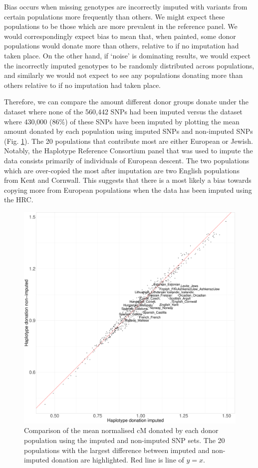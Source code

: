 {Bias occurs when missing genotypes are incorrectly imputed with variants from certain populations more frequently than others. We might expect these populations to be those which are more prevalent in the reference panel. We would correspondingly expect bias to mean that, when painted, some donor populations would donate more than others, relative to if no imputation had taken place. On the other hand, if `noise' is dominating results, we would expect the incorrectly imputed genotypes to be randomly distributed across populations, and similarly we would not expect to see any populations donating more than others relative to if no imputation had taken place. 

Therefore, we can compare the amount different donor groups donate under the dataset where none of the 560,442 SNPs had been imputed versus the dataset where 430,000 (86\%) of these SNPs have been imputed by plotting the mean amount donated by each population using imputed SNPs and non-imputed SNPs (Fig. \ref{fig:imputed_nonimputed_donation}). The 20 populations that contribute most are either European or Jewish. Notably, the Haplotype Reference Consortium panel that was used to impute the data consists primarily of individuals of European descent. The two populations which are over-copied the most after imputation are two English populations from Kent and Cornwall. This suggests that there is a most likely a bias towards copying more from European populations when the data has been imputed using the HRC. 

\begin{figure}[htp]
    \centering
    \includegraphics[width=1.0\textwidth]{../images/chapter1/donation_imputed_nonimputed.pdf}
    \caption{Comparison of the mean normalised cM donated by each donor population using the imputed and non-imputed SNP sets. The 20 populations with the largest difference between imputed and non-imputed donation are highlighted. Red line is line of $y=x$.}
    \label{fig:imputed_nonimputed_donation}
\end{figure}

}
